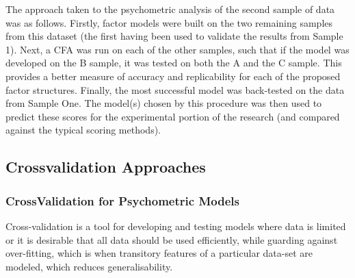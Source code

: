 \documentclass{article}
\begin{document}
The approach taken to the psychometric analysis of the second sample of data was as follows.  Firstly, factor models were built on the two remaining samples from this dataset (the first having been used to validate the results from Sample 1).  Next, a CFA was run on each of the other samples, such that if the model was developed on the B sample, it was tested on both the A and the C sample.  This provides a better measure of accuracy and replicability for each of the proposed factor structures.  Finally, the most successful model was back-tested on the data from Sample One. The model(s) chosen by this procedure was then used to predict these scores for the experimental portion of the research (and compared against the typical scoring methods). 

\subsection{Crossvalidation Approaches}
\label{sec:crossv-appr}



\subsubsection{CrossValidation for Psychometric Models}
\label{sec:crossv-psych-models}

Cross-validation is a tool for developing and testing models where data is limited or it is desirable that all data should be used efficiently, while guarding against over-fitting, which is when transitory features of a particular data-set are modeled, which reduces generalisability. 
\end{document}
